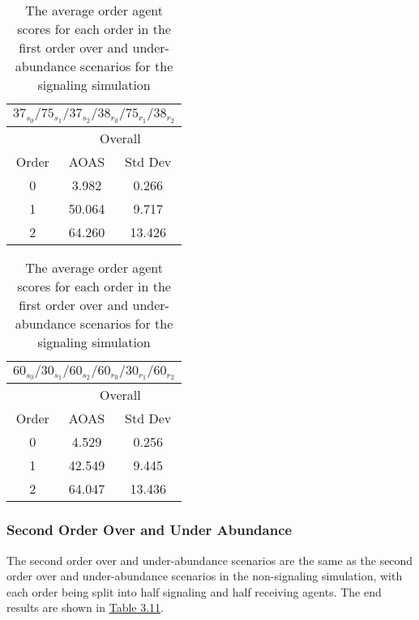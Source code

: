 \begin{table}[h]
    \centering
    \begin{tabular}{|c|c|c|}
        \hline
        \multicolumn{3}{|c|}{$37_{s_{0}}/75_{s_{1}}/37_{s_{2}}/38_{r_{0}}/75_{r_{1}}/38_{r_{2}}$} \\
        \hline
        \multicolumn{1}{|c|}{} & \multicolumn{2}{|c|}{Overall} \\
        \hline
        Order & AOAS & Std Dev \\
        \hline
        0     & 3.982   & 0.266    \\
        1     & 50.064  & 9.717   \\
        2     & 64.260  & 13.426   \\
        \hline
    \end{tabular}
    \qquad
    \begin{tabular}{|c|c|c|}
        \hline
        \multicolumn{3}{|c|}{$60_{s_{0}}/30_{s_{1}}/60_{s_{2}}/60_{r_{0}}/30_{r_{1}}/60_{r_{2}}$} \\
        \hline
        \multicolumn{1}{|c|}{} & \multicolumn{2}{|c|}{Overall} \\
        \hline
        Order & AOAS & Std Dev \\
        \hline
        0     & 4.529   & 0.256    \\
        1     & 42.549  & 9.445   \\
        2     & 64.047  & 13.436   \\
        \hline
    \end{tabular}
    \caption{The average order agent scores for each order in the first order over and under-abundance scenarios for the signaling simulation}
    \label{table:sig-first-order-overall}
\end{table}

\subsubsection{Second Order Over and Under Abundance}

The second order over and under-abundance scenarios are the same as the second order over and under-abundance scenarios in the non-signaling simulation, with each order being split into half signaling and half receiving agents. The end results are shown in \hyperref[table:sig-second-order-simple]{Table 3.11}.

